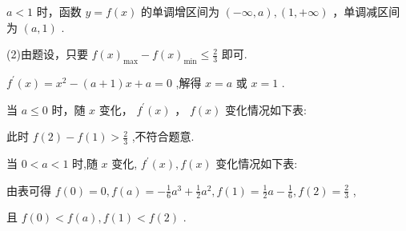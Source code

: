 \documentclass[10pt]{article}
\begin{document}
\(a < 1\) 时，函数 \(y = f\left( x\right)\) 的单调增区间为 \(\left( {-\infty ,a}\right) ,\left( {1, + \infty }\right)\) ，单调减区间为 \(\left( {a,1}\right)\) .

(2)由题设，只要 \(f{\left( x\right) }_{\max } - f{\left( x\right) }_{\min } \leq  \frac{2}{3}\) 即可.

\({f}^{\prime }\left( x\right)  = {x}^{2} - \left( {a + 1}\right) x + a = 0\) ,解得 \(x = a\) 或 \(x = 1\) .

当 \(a \leq  0\) 时，随 \(x\) 变化， \({f}^{\prime }\left( x\right)\) ， \(f\left( x\right)\) 变化情况如下表:

\begin{center}
\end{center}

此时 \(f\left( 2\right)  - f\left( 1\right)  > \frac{2}{3}\) ,不符合题意.

当 \(0 < a < 1\) 时,随 \(x\) 变化, \({f}^{\prime }\left( x\right) ,f\left( x\right)\) 变化情况如下表:

\begin{center}
\end{center}

由表可得 \(f\left( 0\right)  = 0,f\left( a\right)  =  - \frac{1}{6}{a}^{3} + \frac{1}{2}{a}^{2},f\left( 1\right)  = \frac{1}{2}a - \frac{1}{6},f\left( 2\right)  = \frac{2}{3}\) ,

且 \(f\left( 0\right)  < f\left( a\right) ,f\left( 1\right)  < f\left( 2\right)\) .
\end{document}
